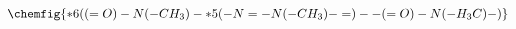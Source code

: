 \documentclass[preview]{standalone}
\begin{document}
\begin{align*}
\chemfig{*6((=O)-N(-CH_3)-*5(-N=-N(-CH_3)-=)--(=O)-N(-H_3C)-)}
\end{align*}
\end{document}
